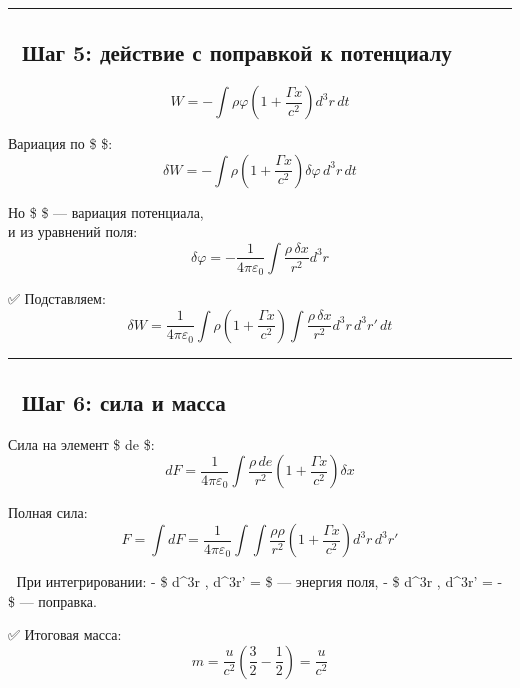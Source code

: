 \documentclass[11pt]{article}
\begin{document}
\begin{center}\rule{0.5\linewidth}{\linethickness}\end{center}

\subsection{🔹 Шаг 5: действие с поправкой к
потенциалу}\label{ux448ux430ux433-5-ux434ux435ux439ux441ux442ux432ux438ux435-ux441-ux43fux43eux43fux440ux430ux432ux43aux43eux439-ux43a-ux43fux43eux442ux435ux43dux446ux438ux430ux43bux443}

\[
W = -\int \rho \varphi \left( 1 + \frac{\Gamma x}{c^2} \right) d^3r \, dt
\]

Вариация по \$ \varphi \$: \[
\delta W = -\int \rho \left( 1 + \frac{\Gamma x}{c^2} \right) \delta \varphi \, d^3r \, dt
\]

Но \$ \delta \varphi \$ --- вариация потенциала,\\
и из уравнений поля: \[
\delta \varphi = -\frac{1}{4\pi\varepsilon_0} \int \frac{\rho \, \delta x}{r^2} d^3r
\]

✅ Подставляем: \[
\delta W = \frac{1}{4\pi\varepsilon_0} \int \rho \left( 1 + \frac{\Gamma x}{c^2} \right) \int \frac{\rho \, \delta x}{r^2} d^3r \, d^3r' \, dt
\]

\begin{center}\rule{0.5\linewidth}{\linethickness}\end{center}

\subsection{🔹 Шаг 6: сила и
масса}\label{ux448ux430ux433-6-ux441ux438ux43bux430-ux438-ux43cux430ux441ux441ux430}

Сила на элемент \$ de \$: \[
dF = \frac{1}{4\pi\varepsilon_0} \int \frac{\rho \, de}{r^2} \left( 1 + \frac{\Gamma x}{c^2} \right) \delta x
\]

Полная сила: \[
F = \int dF = \frac{1}{4\pi\varepsilon_0} \int \int \frac{\rho \rho}{r^2} \left( 1 + \frac{\Gamma x}{c^2} \right) d^3r \, d^3r'
\]

📌 При интегрировании: - \$ \int \int {} d\^{}3r ,
d\^{}3r' =   \$ --- энергия поля, - \$
\int \int {}  d\^{}3r , d\^{}3r'
= -  \$ --- поправка.

✅ Итоговая масса: \[
m = \frac{u}{c^2} \left( \frac{3}{2} - \frac{1}{2} \right) = \frac{u}{c^2}
\]
\end{document}
